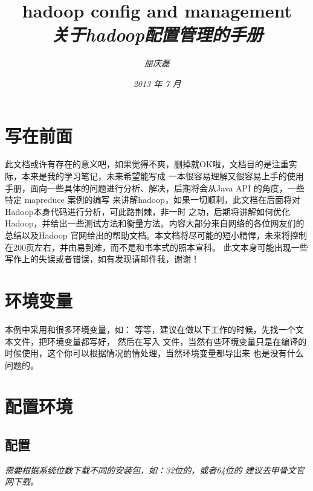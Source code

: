 \documentclass{article}
\begin{document}
\title{%
  {\huge \textsf{hadoop config and management}\\\smallskip}%
  {\small \textit{关于hadoop配置管理的手册}}
}

\author{\textit{屈庆磊}\\[2mm]
       }

\date{\textit{2013 年 7 月}}

\maketitle
\begin{multicols}{2}
\tableofcontents
\end{multicols}

\section{写在前面}
此文档或许有存在的意义吧，如果觉得不爽，删掉就OK啦，文档目的是注重实际，本来是我的学习笔记，未来希望能写成
一本很容易理解又很容易上手的使用手册，面向一些具体的问题进行分析、解决，后期将会从Java API 的角度，一些特定
mapreduce 案例的编写 来讲解hadoop，如果一切顺利，此文档在后面将对Hadoop本身代码进行分析，可此路荆棘，非一时
之功，后期将讲解如何优化 Hadoop，并给出一些测试方法和衡量方法。内容大部分来自网络的各位网友们的总结以及Hadoop
官网给出的帮助文档。本文档将尽可能的短小精悍，未来将控制在200页左右，并由易到难，而不是和书本式的照本宣科。
此文本身可能出现一些写作上的失误或者错误，如有发现请邮件我，谢谢！

\section{环境变量}
本例中采用和很多环境变量，如： 等等，建议在做以下工作的时候，先找一个文本文件，把环境变量都写好，
然后在写入 文件，当然有些环境变量只是在编译的时候使用，这个你可以根据情况酌情处理，当然环境变量都导出来
也是没有什么问题的。

\section{配置环境}
\subsection{配置}
\textit{需要根据系统位数下载不同的安装包，如：32位的，或者64位的
建议去甲骨文官网下载。
}
\end{document}
